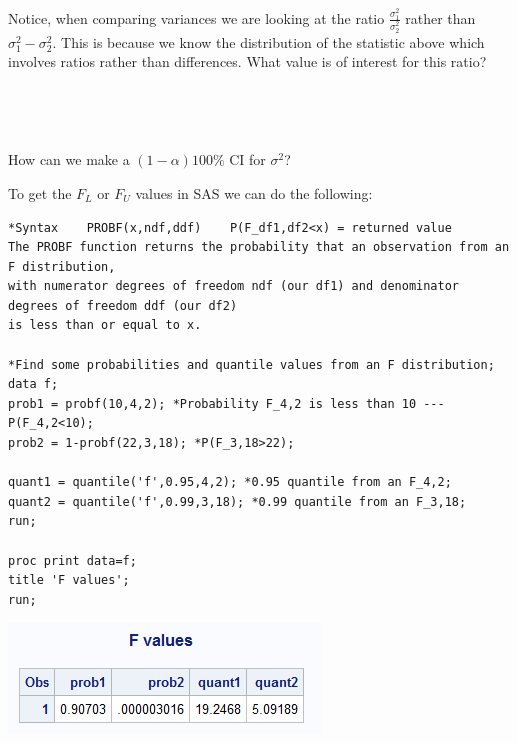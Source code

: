 \newpage

Notice, when comparing variances we are looking at the ratio $\frac{\sigma^2_1}{\sigma^2_2}$ rather than $\sigma^2_1-\sigma^2_2$.  This is because we know the distribution of the statistic above which involves ratios rather than differences.  What value is of interest for this ratio?\\~\\~\\~\\~\\
How can we make a $(1-\alpha)100\%$ CI for $\sigma^2$?

\newpage



To get the $F_L$ or $F_U$ values in SAS we can do the following:
\begin{small}
\begin{verbatim}
*Syntax    PROBF(x,ndf,ddf)    P(F_df1,df2<x) = returned value
The PROBF function returns the probability that an observation from an F distribution, 
with numerator degrees of freedom ndf (our df1) and denominator degrees of freedom ddf (our df2)
is less than or equal to x. 

*Find some probabilities and quantile values from an F distribution;
data f;
prob1 = probf(10,4,2); *Probability F_4,2 is less than 10 --- P(F_4,2<10);
prob2 = 1-probf(22,3,18); *P(F_3,18>22);

quant1 = quantile('f',0.95,4,2); *0.95 quantile from an F_4,2;
quant2 = quantile('f',0.99,3,18); *0.99 quantile from an F_3,18;
run;

proc print data=f;
title 'F values';
run;
\end{verbatim}
\end{small}

\begin{center}
\includegraphics[scale=0.7]{fvalues}
\end{center}

